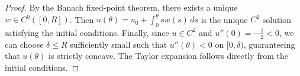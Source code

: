 \documentclass[10pt,a4paper]{amsart}
\begin{document}
\begin{proof}
 
 By the Banach fixed-point theorem, there exists a unique $w \in C^0([0, R])$. Then $u(\theta) = u_0 + \int_0^\theta s w(s) \, ds$ is the unique $C^2$ solution satisfying the initial conditions.  Finally, since $u \in C^2$ and $u''(0) = -\frac12 < 0$, we can choose $\delta \leq R$ sufficiently small such that $u''(\theta) < 0$ on $[0, \delta)$, guaranteeing that $u(\theta)$ is strictly concave. The Taylor expansion follows directly from the initial conditions.

 
\end{proof}
\end{document}
